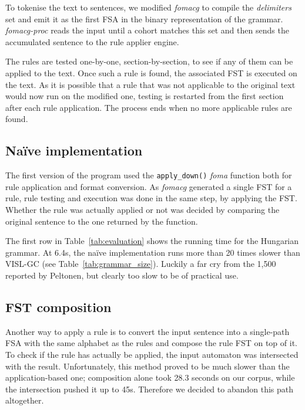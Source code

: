 \documentclass[11pt]{article}
\begin{document}
To tokenise the text to sentences, we modified \emph{fomacg} to compile the
\emph{delimiters} set and emit it as the first FSA in the binary representation
of the grammar. \emph{fomacg-proc} reads the input until a cohort matches this
set and then sends the accumulated sentence to the rule applier engine.

The rules are tested one-by-one, section-by-section, to see if any of them can
be applied to the text. Once such a rule is found, the associated FST is
executed on the text. As it is possible that a rule that was not applicable to
the original text would now run on the modified one, testing is restarted from the
first section after each rule application. The process ends when no more
applicable rules are found.

\subsection{Naïve implementation}
\label{sec:speed_naive}

The first version of the program used the \texttt{apply\_down()} \emph{foma}
function both for rule application and format conversion. As \emph{fomacg}
generated a single FST for a rule, rule testing and execution was done in the
same step, by applying the FST. Whether the rule was actually applied or not was
decided by comparing the original sentence to the one returned by the function.

The first row in Table~\ref{tab:evaluation} shows the running time for the
Hungarian grammar. At 6.4s, the naïve implementation runs more than 20 times
slower than VISL-GC (see Table~\ref{tab:grammar_size}). Luckily a far cry from
the 1,500 reported by Peltonen, but clearly too slow to be of practical use.

\subsection{FST composition}
\label{sec:speed_composition}

Another way to apply a rule is to convert the input sentence into a
single-path FSA with the same alphabet as the rules and compose the rule FST
on top of it. To check if the rule has actually be applied, the input
automaton was intersected with the result. Unfortunately, this method proved to
be much slower than the application-based one; composition alone took 28.3
seconds on our corpus, while the intersection pushed it up to 45s. Therefore we
decided to abandon this path altogether.
\end{document}
